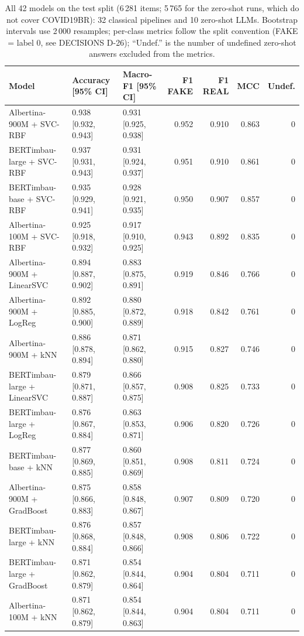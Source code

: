 \begin{table}[t]
\centering
\scriptsize
\caption{All 42 models on the test split (6\,281 items; 5\,765 for the zero-shot runs, which do not cover COVID19BR): 32 classical pipelines and 10 zero-shot LLMs. Bootstrap intervals use 2\,000 resamples; per-class metrics follow the split convention (FAKE = label 0, see DECISIONS D-26); ``Undef.'' is the number of undefined zero-shot answers excluded from the metrics.}
\label{tab:b-model-zoo}
\begin{tabular}{lllrrrr}
\toprule
Model & Accuracy [95\% CI] & Macro-F1 [95\% CI] & F1 FAKE & F1 REAL & MCC & Undef. \\
\midrule
Albertina-900M + SVC-RBF & 0.938 [0.932, 0.943] & 0.931 [0.925, 0.938] & 0.952 & 0.910 & 0.863 & 0 \\
BERTimbau-large + SVC-RBF & 0.937 [0.931, 0.943] & 0.931 [0.924, 0.937] & 0.951 & 0.910 & 0.861 & 0 \\
BERTimbau-base + SVC-RBF & 0.935 [0.929, 0.941] & 0.928 [0.921, 0.935] & 0.950 & 0.907 & 0.857 & 0 \\
Albertina-100M + SVC-RBF & 0.925 [0.918, 0.932] & 0.917 [0.910, 0.925] & 0.943 & 0.892 & 0.835 & 0 \\
Albertina-900M + LinearSVC & 0.894 [0.887, 0.902] & 0.883 [0.875, 0.891] & 0.919 & 0.846 & 0.766 & 0 \\
Albertina-900M + LogReg & 0.892 [0.885, 0.900] & 0.880 [0.872, 0.889] & 0.918 & 0.842 & 0.761 & 0 \\
Albertina-900M + kNN & 0.886 [0.878, 0.894] & 0.871 [0.862, 0.880] & 0.915 & 0.827 & 0.746 & 0 \\
BERTimbau-large + LinearSVC & 0.879 [0.871, 0.887] & 0.866 [0.857, 0.875] & 0.908 & 0.825 & 0.733 & 0 \\
BERTimbau-large + LogReg & 0.876 [0.867, 0.884] & 0.863 [0.853, 0.871] & 0.906 & 0.820 & 0.726 & 0 \\
BERTimbau-base + kNN & 0.877 [0.869, 0.885] & 0.860 [0.851, 0.869] & 0.908 & 0.811 & 0.724 & 0 \\
Albertina-900M + GradBoost & 0.875 [0.866, 0.883] & 0.858 [0.848, 0.867] & 0.907 & 0.809 & 0.720 & 0 \\
BERTimbau-large + kNN & 0.876 [0.868, 0.884] & 0.857 [0.848, 0.866] & 0.908 & 0.806 & 0.722 & 0 \\
BERTimbau-large + GradBoost & 0.871 [0.862, 0.879] & 0.854 [0.844, 0.864] & 0.904 & 0.804 & 0.711 & 0 \\
Albertina-100M + kNN & 0.871 [0.862, 0.879] & 0.854 [0.844, 0.863] & 0.904 & 0.804 & 0.711 & 0 \\

\end{tabular}
\end{table}

